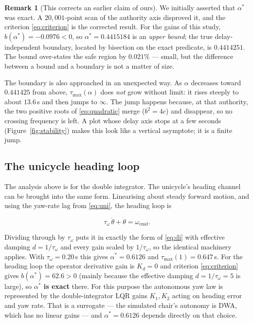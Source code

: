 \documentclass[11pt,a4paper]{article}
\newcommand{\astar}{\alpha^{*}}
\theoremstyle{plain}
\theoremstyle{definition}
\newtheorem{remark}{Remark}
\begin{document}
\begin{remark}[This corrects an earlier claim of ours]
We initially asserted that $\astar$ was exact. A $20{,}001$-point scan
of the authority axis disproved it, and the criterion
\eqref{eq:criterion} is the corrected result. For the gains of this
study, $b(\astar) = -0.0976 < 0$, so $\astar = 0.4415184$ is an
\emph{upper bound}; the true delay-independent boundary, located by
bisection on the exact predicate, is $0.4414251$. The bound
over-states the safe region by $0.021\%$ --- small, but the difference
between a bound and a boundary is not a matter of size.

The boundary is also approached in an unexpected way. As $\alpha$
decreases toward $0.441425$ from above, $\tau_{\max}(\alpha)$ does
\emph{not} grow without limit: it rises steeply to about $13.6$\,s and
then jumps to $\infty$. The jump happens because, at that authority, the
two positive roots of \eqref{eq:quadratic} merge ($b^2 = 4c$) and
disappear, so no crossing frequency is left. A plot whose delay axis
stops at a few seconds (Figure~\ref{fig:stability}) makes this look like
a vertical asymptote; it is a finite jump.
\end{remark}

\subsection{The unicycle heading loop}
\label{sec:headingloop}

The analysis above is for the double integrator. The unicycle's heading
channel can be brought into the same form. Linearising about steady
forward motion, and using the yaw-rate lag from \eqref{eq:uni}, the
heading loop is

\begin{equation}
\tau_\omega\,\ddot\theta + \dot\theta = \omega_{\mathrm{cmd}} .
\label{eq:heading}
\end{equation}

Dividing through by $\tau_\omega$ puts it in exactly the form of
\eqref{eq:di} with effective damping $d = 1/\tau_\omega$ and every gain
scaled by $1/\tau_\omega$, so the identical machinery applies. With
$\tau_\omega = 0.20$\,s this gives $\astar = 0.6126$ and
$\tau_{\max}(1) = 0.647$\,s. For the heading loop the operator
derivative gain is $K_d = 0$ and criterion \eqref{eq:criterion} gives
$b(\astar) = 62.6 > 0$ (mainly because the effective damping
$d = 1/\tau_\omega = 5$ is large), so \textbf{$\astar$ is exact} there.
For this purpose the autonomous yaw law is represented by the
double-integrator LQR gains $K_1, K_2$ acting on heading error and yaw
rate. That is a surrogate --- the simulated chair's autonomy is DWA,
which has no linear gains --- and $\astar = 0.6126$ depends directly on
that choice.
\end{document}
